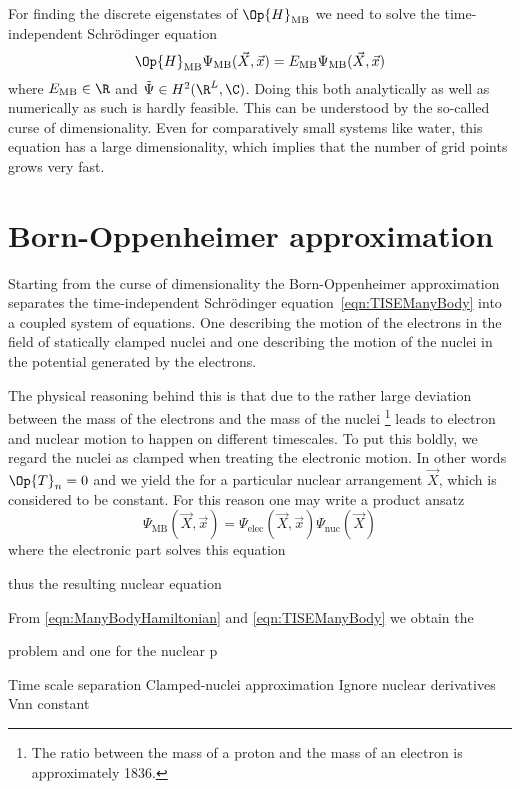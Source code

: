 For finding the discrete eigenstates of $\Op{H}_\text{MB}$
we need to solve the time-independent Schrödinger equation
\begin{equation}
	\Op{H}_\text{MB} \Psi_\text{MB}(\vec{X}, \vec{x})
	= E_\text{MB} \Psi_\text{MB}(\vec{X}, \vec{x})
	\label{eqn:TISEManyBody}
\end{equation}
where $E_\text{MB} \in \R$ and $\tilde{\Psi} \in H^2(\R^L, \C)$.
Doing this both analytically as well as numerically as such is hardly feasible.
This can be understood by the so-called curse of dimensionality.
Even for comparatively small systems like water,
this equation has a large dimensionality,
which implies that the number of grid points grows very fast.

\section{Born-Oppenheimer approximation}
\label{sec:BO}

Starting from the curse of dimensionality
the Born-Oppenheimer approximation separates the time-independent
Schrödinger equation~\eqref{eqn:TISEManyBody} into
a coupled system of equations.
One describing the motion of the electrons in the field of statically
clamped nuclei
and one describing the motion of the nuclei in the potential generated
by the electrons.

The physical reasoning behind this is that due to the rather large deviation
between the mass of the electrons and the mass of the nuclei%
\footnote{The ratio between the mass of a proton and the mass of an electron is
	approximately 1836.}
leads to electron and nuclear motion to happen on different timescales.
To put this boldly, we regard the nuclei as clamped when treating
the electronic motion.
In other words $\Op{T}_n = 0$ and we yield the 
for a particular nuclear arrangement $\vec{X}$,
which is considered to be constant.
For this reason one may write a product ansatz
\[ \Psi_\text{MB}(\vec{X}, \vec{x}) = \Psi_\text{elec}(\vec{X}, \vec{x}) \Psi_\text{nuc}(\vec{X}) \]
where the electronic part solves this equation

thus the resulting nuclear equation


From \eqref{eqn:ManyBodyHamiltonian}
and \eqref{eqn:TISEManyBody}
we obtain the 



problem and one for the nuclear p


Time scale separation
Clamped-nuclei approximation
Ignore nuclear derivatives
Vnn constant



